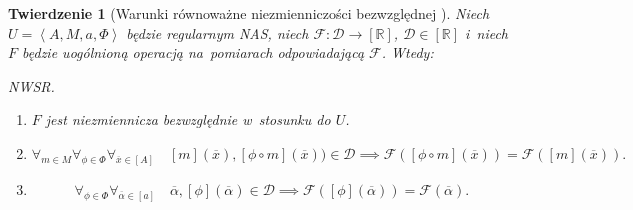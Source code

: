 \documentclass[12pt,a4paper]{report}
\newtheorem{tw}[definition]{Twierdzenie}
\newcommand{\domkniecie}[1]{\left[ {#1} \right] }
\newcommand{\tuple}[1]{\left\langle {#1} \right\rangle}
\begin{document}
\begin{tw}[Warunki równoważne niezmienniczości bezwzględnej {\citep[Tw. 1]{adams1965theory}}]
Niech $U=\tuple{A,M,a,\Phi}$ będzie regularnym NAS, niech $\mathcal{F}:\mathcal{D}\to \domkniecie{\mathbb{R}}$, $\mathcal{D} \in \domkniecie{\mathbb{R}}$ i~niech $F$ będzie uogólnioną operacją na~pomiarach odpowiadającą $\mathcal{F}$. Wtedy:

\item
NWSR.
\begin{enumerate}
\item
$F$ jest niezmiennicza bezwzględnie w~stosunku do $U$. 
\item
$$
\forall_{m \in M}\forall_{\phi \in \Phi} \forall_{\overline{x} \in \domkniecie{A}} \quad \domkniecie{m}(\overline{x}),\domkniecie{\phi \circ m}(\overline{x})) \in \mathcal{D} \implies \mathcal{F}( \domkniecie{\phi \circ m}(\overline{x}))=\mathcal{F}(\domkniecie{m}(\overline{x})).
$$
\item
$$
\forall_{\phi \in \Phi} \forall_{\overline{\alpha} \in \domkniecie{a}} \quad \overline{\alpha}, \domkniecie{\phi}(\overline{\alpha})\in \mathcal{D} \implies \mathcal{F}(\domkniecie{\phi}(\overline{\alpha}))=\mathcal{F}(\overline{\alpha}).
$$
\end{enumerate}

\end{tw}
\end{document}
